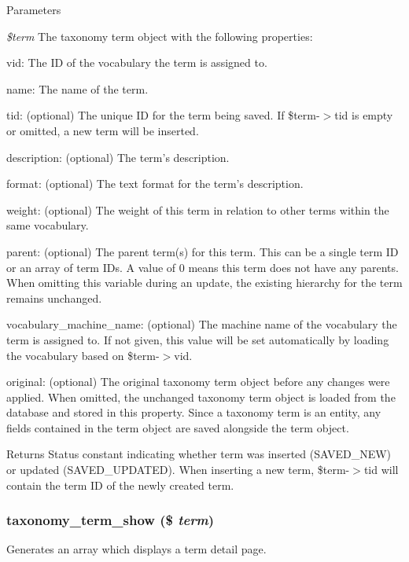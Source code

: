 \begin{DoxyParams}{Parameters}
\item[{\em \$term}]The taxonomy term object with the following properties:
\begin{DoxyItemize}
\item vid: The ID of the vocabulary the term is assigned to.
\item name: The name of the term.
\item tid: (optional) The unique ID for the term being saved. If \$term-\/$>$tid is empty or omitted, a new term will be inserted.
\item description: (optional) The term's description.
\item format: (optional) The text format for the term's description.
\item weight: (optional) The weight of this term in relation to other terms within the same vocabulary.
\item parent: (optional) The parent term(s) for this term. This can be a single term ID or an array of term IDs. A value of 0 means this term does not have any parents. When omitting this variable during an update, the existing hierarchy for the term remains unchanged.
\item vocabulary\_\-machine\_\-name: (optional) The machine name of the vocabulary the term is assigned to. If not given, this value will be set automatically by loading the vocabulary based on \$term-\/$>$vid.
\item original: (optional) The original taxonomy term object before any changes were applied. When omitted, the unchanged taxonomy term object is loaded from the database and stored in this property. Since a taxonomy term is an entity, any fields contained in the term object are saved alongside the term object.
\end{DoxyItemize}\end{DoxyParams}
\begin{DoxyReturn}{Returns}
Status constant indicating whether term was inserted (SAVED\_\-NEW) or updated (SAVED\_\-UPDATED). When inserting a new term, \$term-\/$>$tid will contain the term ID of the newly created term. 
\end{DoxyReturn}
\hypertarget{taxonomy_8module_a6f503eb94771c54eca8b4529308f19b6}{
\subsubsection[{taxonomy\_\-term\_\-show}]{\setlength{\rightskip}{0pt plus 5cm}taxonomy\_\-term\_\-show (\$ {\em term})}}
\label{taxonomy_8module_a6f503eb94771c54eca8b4529308f19b6}
Generates an array which displays a term detail page.


